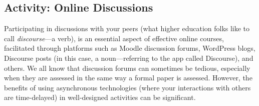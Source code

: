 \documentclass[
  letterpaper,
  DIV=11,
  numbers=noendperiod]{scrreprt}
\begin{document}
\subsection{Activity: Online
Discussions}\label{activity-online-discussions}

Participating in discussions with your peers (what higher education
folks like to call \emph{discourse}---a verb), is an essential aspect of
effective online courses, facilitated through platforms such as Moodle
discussion forums, WordPress blogs, Discourse posts (in this case, a
noun---referring to the app called Discourse), and others. We all know
that discussion forums can sometimes be tedious, especially when they
are assessed in the same way a formal paper is assessed. However, the
benefits of using asynchronous technologies (where your interactions
with others are time-delayed) in well-designed activities can be
significant.
\end{document}

